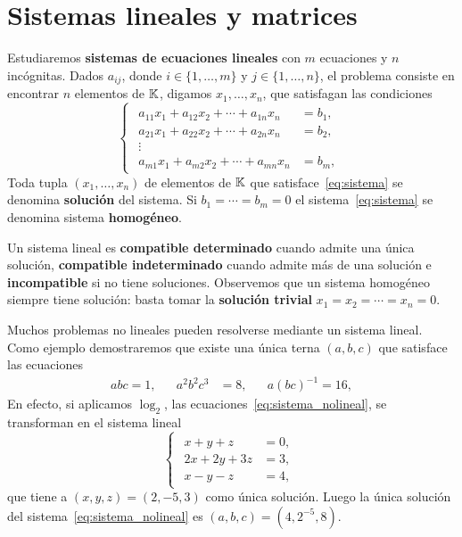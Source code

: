 \section{Sistemas lineales y matrices}

\begin{block}
	Estudiaremos \textbf{sistemas de ecuaciones lineales} con $m$
	ecuaciones y $n$ incógnitas. Dados $a_{ij}$, donde $i\in\{1,\dots,m\}$ y
	$j\in\{1,\dots,n\}$, el problema consiste en encontrar $n$
	elementos de $\mathbb{K}$, digamos $x_1,\dots,x_n$, que satisfagan las condiciones
	\begin{equation}
		\label{eq:sistema}
		\begin{cases}
			\begin{aligned}
				a_{11}x_1+a_{12}x_2+\cdots+a_{1n}x_n&=b_1,\\
				a_{21}x_1+a_{22}x_2+\cdots+a_{2n}x_n&=b_2,\\
				\vdots\\
				a_{m1}x_1+a_{m2}x_2+\cdots+a_{mn}x_n&=b_m,
			\end{aligned}
		\end{cases}
	\end{equation}
	Toda tupla
	$(x_1,\dots,x_n)$ de elementos de $\mathbb{K}$ que satisface~\eqref{eq:sistema} se
	denomina \textbf{solución} del sistema. Si $b_1=\cdots=b_m=0$ el
	sistema~\eqref{eq:sistema} se denomina sistema \textbf{homogéneo}.
\end{block}

\begin{block}
	Un sistema lineal es \textbf{compatible determinado} cuando admite una
	única solución, \textbf{compatible indeterminado} cuando admite más de una
	solución e \textbf{incompatible} si no tiene soluciones.  Observemos que un
	sistema homogéneo siempre tiene solución: basta tomar la \textbf{solución
	trivial} $x_1=x_2=\cdots=x_n=0$.
\end{block}

\begin{example}
    Muchos problemas no lineales pueden resolverse mediante un sistema lineal.
    Como ejemplo demostraremos que existe una única terna $(a,b,c)$ que
    satisface las ecuaciones 
    \begin{equation}
        \label{eq:sistema_nolineal}
        \begin{aligned}
            abc=1, && a^2b^2c^3&=8, && a(bc)^{-1}=16, 
        \end{aligned}
    \end{equation}
    En efecto, si aplicamos $\log_2$, las
    ecuaciones~\eqref{eq:sistema_nolineal}, se transforman en el sistema lineal 
    \[
        \begin{cases}
            \begin{aligned}
                x+y+z &= 0,\\
                2x+2y+3z &= 3,\\
                x-y-z &= 4,
            \end{aligned}
        \end{cases}
    \]
    que tiene a $(x,y,z)=(2,-5,3)$ como única solución. Luego
    la única solución del
    sistema~\eqref{eq:sistema_nolineal} es $(a,b,c)=(4,2^{-5},8)$.
\end{example}

